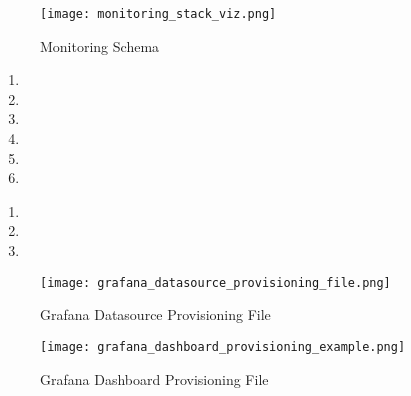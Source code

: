 \documentclass[14pt,compress,usenames,dvipsnames,aspectratio=169]{beamer}
\begin{document}
\begin{frame}{}
    \begin{figure}
        \centering
        \texttt{[image: monitoring\_stack\_viz.png]}
        \caption{Monitoring Schema}
        \label{fig:enter-label}
    \end{figure} 
\end{frame}





\begin{frame}{}
    \begin{enumerate}
        \item{} 
        \item{}
        \item{}
        \item{}
        \item{}
        \item{}
    \end{enumerate}
\end{frame}


\begin{frame}{}
    \begin{enumerate}
        \item{}
        \item{}
        \item{}
 
    \end{enumerate}
\end{frame}


\begin{figure}
    \centering
    \texttt{[image: grafana\_datasource\_provisioning\_file.png]}
    \caption{Grafana Datasource Provisioning File}
    \label{fig:enter-label}
\end{figure}
 
\begin{figure}
    \centering
    \texttt{[image: grafana\_dashboard\_provisioning\_example.png]}
    \caption{Grafana Dashboard Provisioning File}
    \label{fig:enter-label}
\end{figure}
\end{document}
